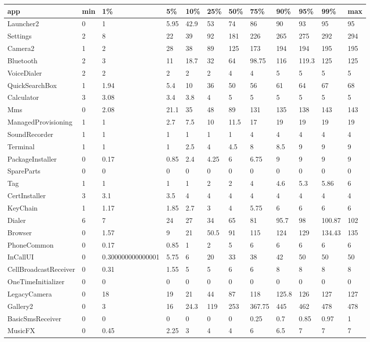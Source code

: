 \documentclass[a4paper]{article}
\begin{document}
\begin{tabular}{|l|l|l|l|l|l|l|l|l|l|l|l|}
\hline
app&min&1\%&5\%&10\%&25\%&50\%&75\%&90\%&95\%&99\%&max\\
\hline
Launcher2&0&1&5.95&42.9&53&74&86&90&93&95&95\\
\hline
Settings&2&8&22&39&92&181&226&265&275&292&294\\
\hline
Camera2&1&2&28&38&89&125&173&194&194&195&195\\
\hline
Bluetooth&2&3&11&18.7&32&64&98.75&116&119.3&125&125\\
\hline
VoiceDialer&2&2&2&2&2&4&4&5&5&5&5\\
\hline
QuickSearchBox&1&1.94&5.4&10&36&50&56&61&64&67&68\\
\hline
Calculator&3&3.08&3.4&3.8&4&5&5&5&5&5&5\\
\hline
Mms&0&2.08&21.1&35&48&89&131&135&138&143&143\\
\hline
ManagedProvisioning&1&1&2.7&7.5&10&11.5&17&19&19&19&19\\
\hline
SoundRecorder&1&1&1&1&1&1&4&4&4&4&4\\
\hline
Terminal&1&1&1&2.5&4&4.5&8&8.5&9&9&9\\
\hline
PackageInstaller&0&0.17&0.85&2.4&4.25&6&6.75&9&9&9&9\\
\hline
SpareParts&0&0&0&0&0&0&0&0&0&0&0\\
\hline
Tag&1&1&1&1&2&2&4&4.6&5.3&5.86&6\\
\hline
CertInstaller&3&3.1&3.5&4&4&4&4&4&4&4&4\\
\hline
KeyChain&1&1.17&1.85&2.7&3&4&5.75&6&6&6&6\\
\hline
Dialer&6&7&24&27&34&65&81&95.7&98&100.87&102\\
\hline
Browser&0&1.57&9&21&50.5&91&115&124&129&134.43&135\\
\hline
PhoneCommon&0&0.17&0.85&1&2&5&6&6&6&6&6\\
\hline
InCallUI&0&0.300000000000001&5.75&6&20&33&38&42&50&50&50\\
\hline
CellBroadcastReceiver&0&0.31&1.55&5&5&6&6&8&8&8&8\\
\hline
OneTimeInitializer&0&0&0&0&0&0&0&0&0&0&0\\
\hline
LegacyCamera&0&18&19&21&44&87&118&125.8&126&127&127\\
\hline
Gallery2&0&3&16&24.3&119&253&367.75&445&462&478&478\\
\hline
BasicSmsReceiver&0&0&0&0&0&0&0.25&0.7&0.85&0.97&1\\
\hline
MusicFX&0&0.45&2.25&3&4&4&6&6.5&7&7&7\\

\end{tabular}
\end{document}

